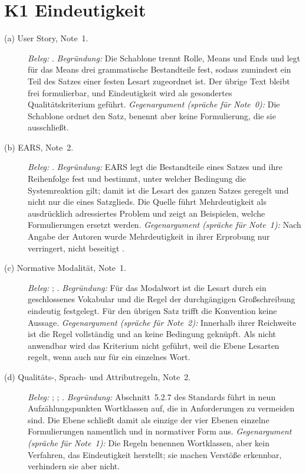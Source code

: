 \documentclass[11pt,a4paper]{report}
\begin{document}
\section{K1 Eindeutigkeit}
\label{sec:anhang-k1}

\begin{description}
  \item[(a) User Story, Note~1.]
  \emph{Beleg:} \cite[Abschn.~2, 2.3 und 3.1.6]{lucassen2016qus}.
  \emph{Begründung:} Die Schablone trennt Rolle, Means und Ends und legt
  für das Means drei grammatische Bestandteile fest, sodass zumindest
  ein Teil des Satzes einer festen Lesart zugeordnet ist. Der übrige
  Text bleibt frei formulierbar, und Eindeutigkeit wird als gesondertes
  Qualitätskriterium geführt.
  \emph{Gegenargument (spräche für Note~0):} Die Schablone ordnet den
  Satz, benennt aber keine Formulierung, die sie ausschließt.

  \item[(b) EARS, Note~2.]
  \emph{Beleg:} \cite[Abschn.~2, 4.1, 5 und 6]{mavin2009ears}.
  \emph{Begründung:} EARS legt die Bestandteile eines Satzes und ihre
  Reihenfolge fest und bestimmt, unter welcher Bedingung die
  Systemreaktion gilt; damit ist die Lesart des ganzen Satzes geregelt
  und nicht nur die eines Satzglieds. Die Quelle führt Mehrdeutigkeit
  als ausdrücklich adressiertes Problem und zeigt an Beispielen, welche
  Formulierungen ersetzt werden.
  \emph{Gegenargument (spräche für Note~1):} Nach Angabe der Autoren
  wurde Mehrdeutigkeit in ihrer Erprobung nur verringert, nicht
  beseitigt \cite[Abschn.~6]{mavin2009ears}.

  \item[(c) Normative Modalität, Note~1.]
  \emph{Beleg:} \cite[Abschn.~1--5]{rfc2119}; \cite[Abschn.~2]{rfc8174}.
  \emph{Begründung:} Für das Modalwort ist die Lesart durch ein
  geschlossenes Vokabular und die Regel der durchgängigen
  Großschreibung eindeutig festgelegt. Für den übrigen Satz trifft die
  Konvention keine Aussage.
  \emph{Gegenargument (spräche für Note~2):} Innerhalb ihrer Reichweite
  ist die Regel vollständig und an keine Bedingung geknüpft. Als nicht
  anwendbar wird das Kriterium nicht geführt, weil die Ebene Lesarten
  regelt, wenn auch nur für ein einzelnes Wort.

  \item[(d) Qualitäts-, Sprach- und Attributregeln, Note~2.]
  \emph{Beleg:} \cite[Abschn.~5.2.5 und 5.2.7]{iso29148};
  \cite[Abschn.~Testing the Hypothesis]{mavin2010bigears};
  \cite[Tab.~1 und Abschn.~3.1.6]{lucassen2016qus}.
  \emph{Begründung:} Abschnitt~5.2.7 des Standards führt in neun
  Aufzählungspunkten Wortklassen auf, die in Anforderungen zu vermeiden
  sind. Die Ebene schließt damit als einzige der vier Ebenen einzelne
  Formulierungen namentlich und in normativer Form aus.
  \emph{Gegenargument (spräche für Note~1):} Die Regeln benennen
  Wortklassen, aber kein Verfahren, das Eindeutigkeit herstellt; sie
  machen Verstöße erkennbar, verhindern sie aber nicht.
\end{description}
\end{document}
